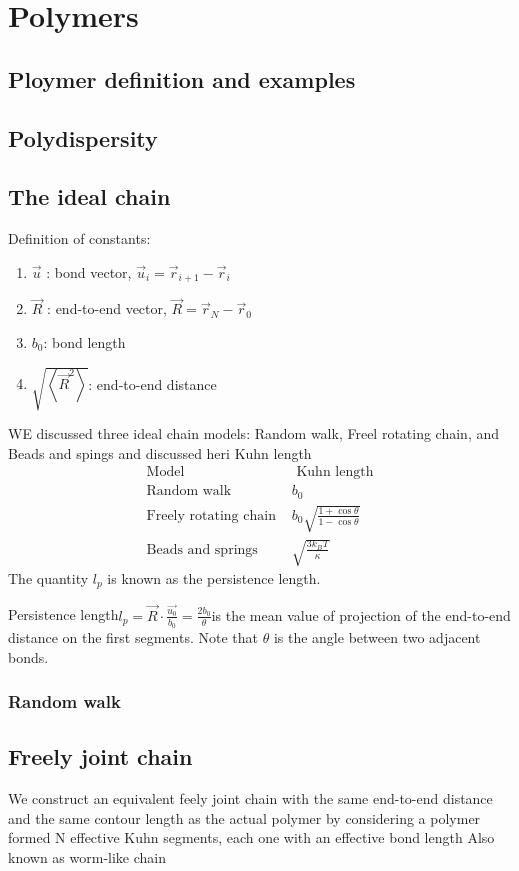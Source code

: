 \documentclass[12pt,a4paper]{article}
\begin{document}
\section{Polymers}
\subsection{Ploymer definition and examples}
\subsection{Polydispersity}
\subsection{The ideal chain}
Definition of constants:
\begin{enumerate}
    \item $\vec{u}$ : bond vector, $\vec{u}_i=\vec{r}_{i+1}-\vec{r}_i$
    \item $\vec{R}$ : end-to-end vector, $\vec{R}=\vec{r}_N-\vec{r}_0$
    \item $b_0$: bond length
    \item $\sqrt{\left\langle\vec{R}^2\right\rangle}$: end-to-end distance 
\end{enumerate}
WE discussed three ideal chain models: Random walk, Freel rotating chain, and Beads and spings and discussed heri Kuhn length
$$
\begin{array}{ll}
    \hline \text { Model } & \text { Kuhn length } \\
    \hline \text { Random walk } & b_0 \\
    \text { Freely rotating chain } & b_0 \sqrt{\frac{1+\cos \theta}{1-\cos \theta}} \\
    \text { Beads and springs } & \sqrt{\frac{3 k_B T}{\kappa}}
\end{array}
$$
The quantity $l_p$ is known as the persistence length.

\begin{definition}
    {Persistence length}{$l_p = \vec{R} \cdot \frac{\vec{u_0}}{b_0} = \frac{2b_0}{\theta}$}{is the mean value of projection of the end-to-end distance on the first segments. Note that $\theta$ is the angle between two adjacent bonds.}
\end{definition}
\subsubsection{Random walk}
\subsection{Freely joint chain}
We construct an equivalent feely joint chain with the same end-to-end distance and the same contour length as the actual polymer by considering a polymer formed N effective Kuhn segments, each one with an effective bond length  
Also known as worm-like chain
\end{document}
